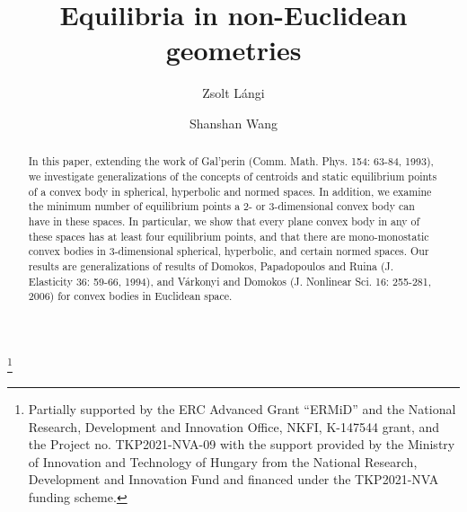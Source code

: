 \documentclass[twoside]{amsart}
\theoremstyle{plain}
\theoremstyle{definition}
\numberwithin{equation}{section}
\begin{document}
\title[Equilibria]{Equilibria in non-Euclidean geometries}

\author[Z. L\'angi]{Zsolt L\'angi}
\author[S. Wang]{Shanshan Wang}

\address{Zsolt L\'angi, Bolyai Institute, University of Szeged\\
Aradi v\'ertan\'uk tere 1, H-6720 Szeged, Hungary, and\\
Alfr\'ed R\'enyi Institute of Mathematics\\
Re\'altanoda utca 13-15, H-1053, Budapest, Hungary}
\address{Shanshan Wang, Bolyai Institute, University of Szeged\\
Aradi v\'ertan\'uk tere 1, H-6720 Szeged, Hungary}

\thanks{Partially supported by the ERC Advanced Grant ``ERMiD'' and the National Research, Development and Innovation Office, NKFI, K-147544 grant, and the Project no. TKP2021-NVA-09 with the support provided by the Ministry of Innovation and Technology of Hungary from the National Research, Development and Innovation Fund and financed under the TKP2021-NVA funding scheme.}


\begin{abstract}
In this paper, extending the work of Gal'perin (Comm. Math. Phys. 154: 63-84, 1993), we investigate generalizations of the concepts of centroids and static equilibrium points of a convex body in spherical, hyperbolic and normed spaces. In addition, we examine the minimum number of equilibrium points a $2$- or $3$-dimensional convex body can have in these spaces. In particular, we show that every plane convex body in any of these spaces has at least four equilibrium points, and that there are mono-monostatic convex bodies in $3$-dimensional spherical, hyperbolic, and certain normed spaces. Our results are generalizations of results of Domokos, Papadopoulos and Ruina (J. Elasticity 36: 59-66, 1994), and V\'arkonyi and Domokos (J. Nonlinear Sci. 16: 255-281, 2006) for convex bodies in Euclidean space.
\end{abstract}

\maketitle
\end{document}
